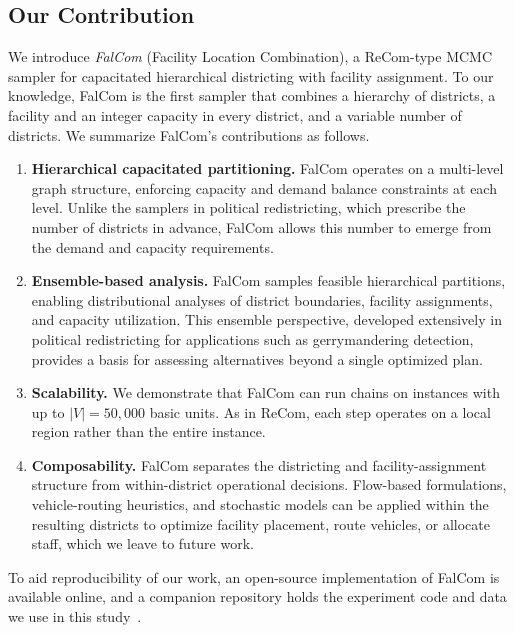 \documentclass[11pt]{article}
\theoremstyle{definition}
\begin{document}
\subsection{Our Contribution}
\label{sec:contribution}
We introduce \emph{FalCom} (Facility Location Combination), a
ReCom-type MCMC sampler for capacitated hierarchical districting
with facility assignment. To our knowledge, FalCom is the first 
sampler that combines a hierarchy of districts, a facility and 
an integer capacity in every district, and a variable number of 
districts. We summarize FalCom's contributions as follows.
\vspace{2mm}
\begin{enumerate}[nosep, label=(\roman*)]
     \item \textbf{Hierarchical capacitated partitioning.}
        FalCom operates on a multi-level graph structure, enforcing
        capacity and demand balance constraints at each level. Unlike the 
        samplers in political redistricting, which prescribe the number of 
        districts in advance, FalCom allows this number to emerge from the 
        demand and capacity requirements.
    \item \textbf{Ensemble-based analysis.} FalCom samples feasible hierarchical 
        partitions, enabling distributional analyses of district boundaries, facility
        assignments, and capacity utilization. This ensemble perspective, developed
        extensively in political redistricting for applications such as
        gerrymandering detection, provides a basis for assessing alternatives 
        beyond a single optimized plan.

    \item \textbf{Scalability.}  We demonstrate that FalCom can run chains on 
        instances with up to $|V| = 50{,}000$ basic units. As in ReCom, each 
        step operates on a local region rather than the entire instance. 
    \item \textbf{Composability.} FalCom separates the districting and 
        facility-assignment structure from within-district operational decisions. 
        Flow-based formulations, vehicle-routing heuristics, and stochastic models 
        can be applied within the resulting districts to optimize facility placement,
        route vehicles, or allocate staff, which we leave to future work.
    \end{enumerate}
\vspace{2mm}

To aid reproducibility of our work, an open-source implementation of FalCom is 
available online, and a companion repository holds the experiment code and data
we use in this study~\citep{falcomchain}.
\end{document}
